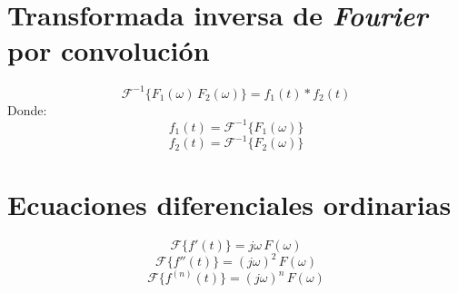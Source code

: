 \section{Transformada inversa de \emph{Fourier} por convolución}
\begin{equation}
    \mathcal{F}^{-1}\{F_1(\omega)\,F_2(\omega)\}=f_1(t)*f_2(t)
\end{equation}
Donde:
\begin{equation*}
    f_1(t)=\mathcal{F}^{-1}\{F_1(\omega)\}
\end{equation*}
\begin{equation*}
    f_2(t)=\mathcal{F}^{-1}\{F_2(\omega)\}
\end{equation*}

\section{Ecuaciones diferenciales ordinarias}
\begin{equation*}
    \mathcal{F}\{f'(t)\}=j\omega\,F(\omega)
\end{equation*}
\begin{equation*}
    \mathcal{F}\{f''(t)\}={(j\omega)}^2\,F(\omega)
\end{equation*}
\begin{equation*}
    \mathcal{F}\{f^{(n)}(t)\}={(j\omega)}^n\,F(\omega)
\end{equation*}

